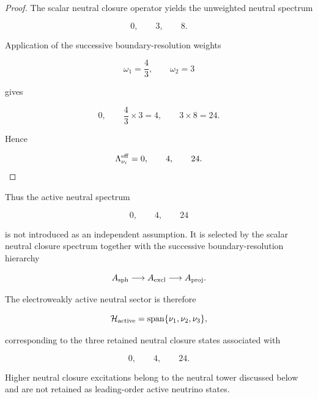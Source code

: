 \documentclass[11pt]{article}
\theoremstyle{definition}
\theoremstyle{remark}
\begin{document}
\begin{proof}

The scalar neutral closure operator yields the unweighted
neutral spectrum

\begin{equation}
0,
\qquad
3,
\qquad
8.
\end{equation}

Application of the successive boundary-resolution weights

\begin{equation}
\omega_1=\frac43,
\qquad
\omega_2=3
\end{equation}

gives

\begin{equation}
0,
\qquad
\frac43\times3=4,
\qquad
3\times8=24.
\end{equation}

Hence

\begin{equation}
\Lambda_{\nu_i}^{\rm eff}
=
0,
\qquad
4,
\qquad
24.
\end{equation}

\end{proof}

Thus the active neutral spectrum

\begin{equation}
0,
\qquad
4,
\qquad
24
\end{equation}

is not introduced as an independent assumption. It is selected
by the scalar neutral closure spectrum together with the
successive boundary-resolution hierarchy

\begin{equation}
A_{\rm sph}
\longrightarrow
A_{\rm excl}
\longrightarrow
A_{\rm proj}.
\end{equation}

The electroweakly active neutral sector is therefore

\begin{equation}
\mathcal H_{\rm active}
=
\operatorname{span}
\{\nu_1,\nu_2,\nu_3\},
\end{equation}

corresponding to the three retained neutral closure states
associated with

\begin{equation}
0,
\qquad
4,
\qquad
24.
\end{equation}

Higher neutral closure excitations belong to the neutral tower
discussed below and are not retained as leading-order active
neutrino states.
\end{document}
